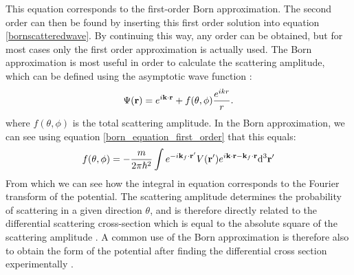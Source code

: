 This equation corresponds to the first-order Born approximation. The second order can then be found by inserting this first order solution into equation \ref{bornscatteredwave}. By continuing this way, any order can be obtained, but for most cases only the first order approximation is actually used. The Born approximation is most useful in order to calculate the scattering amplitude, which can be defined using the asymptotic wave function \cite{Griffiths_QM}:
\begin{equation}
	\Psi(\vb{r}) = e^{i\vb{k}\cdot \vb{r}} + f(\theta,\phi) \frac{e^{ikr}}{r}.
\end{equation}
where $f(\theta,\phi)$ is  the total scattering amplitude. In the Born approximation, we can see using equation \ref{born_equation_first_order} that this equals:
\begin{equation}\label{scattering_amplitude}
	 f(\theta,\phi) = -  \frac{m}{2 \pi \hbar^2} \int e^{-i\vb{k}_f\cdot \vb{r'}}V(\vb{r}')e^{i\vb{k}\cdot\vb{r}-\vb{k}_f\cdot \vb{r}}\dd^3 \vb{r}'
\end{equation}
From which we can see how the integral in equation corresponds to the Fourier transform of the potential. The scattering amplitude determines the probability of scattering in a given direction $\theta$, and is therefore directly related to the differential scattering cross-section which is equal to the absolute square of the scattering amplitude \cite{Griffiths_QM}. A common use of the Born approximation is therefore also to obtain the form of the potential after finding the differential cross section experimentally \cite{born_detailed}.
